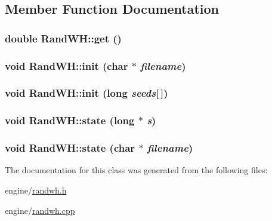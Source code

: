 \subsection{Member Function Documentation}
\hypertarget{classRandWH_aee09f663e825d7cd6f66eb8bd0200112}{
\subsubsection[{get}]{\setlength{\rightskip}{0pt plus 5cm}double RandWH::get ()}}
\label{classRandWH_aee09f663e825d7cd6f66eb8bd0200112}
\hypertarget{classRandWH_ae18fe372528b36f76ed3c36ed4e8ebbf}{
\subsubsection[{init}]{\setlength{\rightskip}{0pt plus 5cm}void RandWH::init (char $\ast$ {\em filename})}}
\label{classRandWH_ae18fe372528b36f76ed3c36ed4e8ebbf}
\hypertarget{classRandWH_a8c373ceb6c13088ae8053b9c5f79ccea}{
\subsubsection[{init}]{\setlength{\rightskip}{0pt plus 5cm}void RandWH::init (long {\em seeds}\mbox{[}$\,$\mbox{]})}}
\label{classRandWH_a8c373ceb6c13088ae8053b9c5f79ccea}
\hypertarget{classRandWH_a3daac6243983e16e361f763ac0748777}{
\subsubsection[{state}]{\setlength{\rightskip}{0pt plus 5cm}void RandWH::state (long $\ast$ {\em s})}}
\label{classRandWH_a3daac6243983e16e361f763ac0748777}
\hypertarget{classRandWH_a98737ce014ca577b4ab6af733a8056f9}{
\subsubsection[{state}]{\setlength{\rightskip}{0pt plus 5cm}void RandWH::state (char $\ast$ {\em filename})}}
\label{classRandWH_a98737ce014ca577b4ab6af733a8056f9}


The documentation for this class was generated from the following files:\begin{DoxyCompactItemize}
\item 
engine/\hyperlink{randwh_8h}{randwh.h}\item 
engine/\hyperlink{randwh_8cpp}{randwh.cpp}\end{DoxyCompactItemize}
